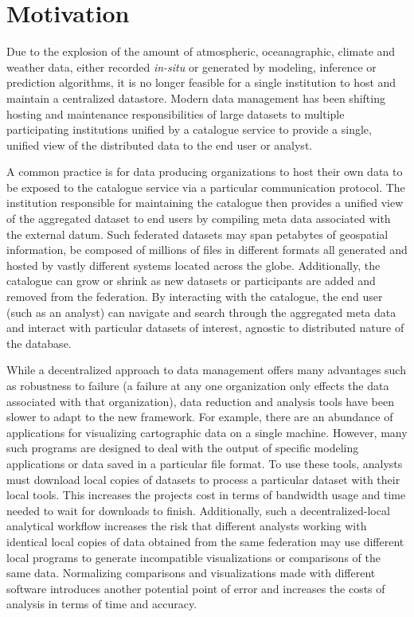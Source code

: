 \section{Motivation}
\label{sec:motivation}
Due to the explosion of the amount of atmospheric, oceanagraphic,
climate and weather data, either recorded \emph{in-situ} or generated
by modeling, inference or prediction algorithms, it is no longer
feasible for a single institution to host and maintain a centralized
datastore. Modern data management has been shifting hosting and
maintenance responsibilities of large datasets to multiple
participating institutions unified by a catalogue service to provide a
single, unified view of the distributed data to the end user or
analyst.

A common practice is for data producing organizations to host their
own data to be exposed to the catalogue service via a particular
communication protocol. The institution responsible for maintaining
the catalogue then provides a unified view of the aggregated dataset
to end users by compiling meta data associated with the external
datum. Such federated datasets may span petabytes of geospatial
information, be composed of millions of files in different formats all
generated and hosted by vastly different systems located across the
globe. Additionally, the catalogue can grow or shrink as new datasets
or participants are added and removed from the federation. By
interacting with the catalogue, the end user (such as an analyst) can
navigate and search through the aggregated meta data and interact with
particular datasets of interest, agnostic to distributed nature of the
database.

While a decentralized approach to data management offers many
advantages such as robustness to failure (a failure at any one
organization only effects the data associated with that organization),
data reduction and analysis tools have been slower to adapt to the new
framework. For example, there are an abundance of applications for
visualizing cartographic data on a single machine. However, many such
programs are designed to deal with the output of specific modeling
applications or data saved in a particular file format. To use these
tools, analysts must download local copies of datasets to process a
particular dataset with their local tools. This increases the projects
cost in terms of bandwidth usage and time needed to wait for downloads
to finish. Additionally, such a decentralized-local analytical
workflow increases the risk that different analysts working with
identical local copies of data obtained from the same federation may
use different local programs to generate incompatible visualizations
or comparisons of the same data. Normalizing comparisons and
visualizations made with different software introduces another
potential point of error and increases the costs of analysis in terms
of time and accuracy.

